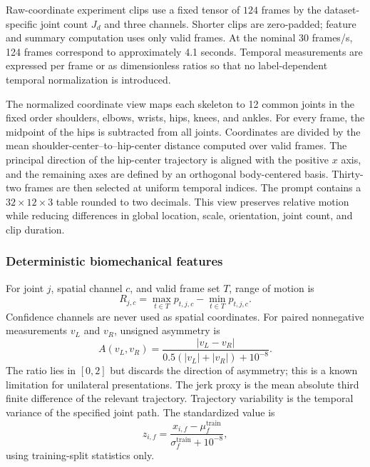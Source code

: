 Raw-coordinate experiment clips use a fixed tensor of $124$ frames by the dataset-specific joint count $J_d$ and three channels. Shorter clips are zero-padded; feature and summary computation uses only valid frames. At the nominal 30 frames/s, 124 frames correspond to approximately 4.1 seconds. Temporal measurements are expressed per frame or as dimensionless ratios so that no label-dependent temporal normalization is introduced.

The normalized coordinate view maps each skeleton to 12 common joints in the fixed order shoulders, elbows, wrists, hips, knees, and ankles. For every frame, the midpoint of the hips is subtracted from all joints. Coordinates are divided by the mean shoulder-center--to--hip-center distance computed over valid frames. The principal direction of the hip-center trajectory is aligned with the positive $x$ axis, and the remaining axes are defined by an orthogonal body-centered basis. Thirty-two frames are then selected at uniform temporal indices. The prompt contains a $32\times12\times3$ table rounded to two decimals. This view preserves relative motion while reducing differences in global location, scale, orientation, joint count, and clip duration.

\subsubsection{Deterministic biomechanical features}

For joint $j$, spatial channel $c$, and valid frame set $T$, range of motion is
\begin{equation}
R_{j,c}=\max_{t\in T}p_{t,j,c}-\min_{t\in T}p_{t,j,c}.
\end{equation}
Confidence channels are never used as spatial coordinates. For paired nonnegative measurements $v_L$ and $v_R$, unsigned asymmetry is
\begin{equation}
A(v_L,v_R)=\frac{|v_L-v_R|}{0.5(|v_L|+|v_R|)+10^{-8}}.
\end{equation}
The ratio lies in $[0,2]$ but discards the direction of asymmetry; this is a known limitation for unilateral presentations. The jerk proxy is the mean absolute third finite difference of the relevant trajectory. Trajectory variability is the temporal variance of the specified joint path. The standardized value is
\begin{equation}
z_{i,f}=\frac{x_{i,f}-\mu_f^{\mathrm{train}}}{\sigma_f^{\mathrm{train}}+10^{-8}},
\end{equation}
using training-split statistics only.

